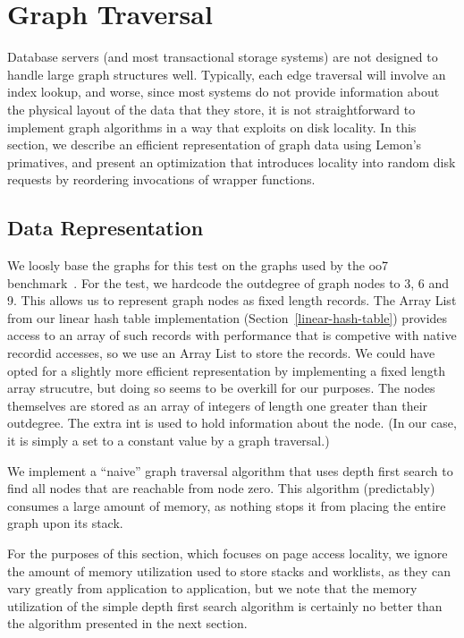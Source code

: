 \documentclass[letterpaper,twocolumn,english]{article}
\newcommand{\yad}{Lemon\xspace}
\begin{document}
\section{Graph Traversal\label{TransClos}}

Database servers (and most transactional storage systems) are not
designed to handle large graph structures well.  Typically, each edge
traversal will involve an index lookup, and worse, since most systems
do not provide information about the physical layout of the data that
they store, it is not straightforward to implement graph algorithms in
a way that exploits on disk locality.  In this section, we describe an
efficient representation of graph data using \yad's primatives, and
present an optimization that introduces locality into random disk
requests by reordering invocations of wrapper functions.

\subsection {Data Representation}

We loosly base the graphs for this test on the graphs used by the oo7
benchmark~\cite{oo7}.  For the test, we hardcode the outdegree of
graph nodes to 3, 6 and 9.  This allows us to represent graph nodes as
fixed length records.  The Array List from our linear hash table
implementation (Section~\ref{linear-hash-table}) provides access to an
array of such records with performance that is competive with native
recordid accesses, so we use an Array List to store the records.  We
could have opted for a slightly more efficient representation by
implementing a fixed length array strucutre, but doing so seems to be
overkill for our purposes.  The nodes themselves are stored as an
array of integers of length one greater than their outdegree. The
extra int is used to hold information about the node.  (In our case,
it is simply a set to a constant value by a graph traversal.)

We implement a ``naive'' graph traversal algorithm that uses depth
first search to find all nodes that are reachable from node zero.
This algorithm (predictably) consumes a large amount of memory, as
nothing stops it from placing the entire graph upon its stack.  

For the purposes of this section, which focuses on page access
locality, we ignore the amount of memory utilization used to store
stacks and worklists, as they can vary greatly from application to
application, but we note that the memory utilization of the simple
depth first search algorithm is certainly no better than the algorithm
presented in the next section.
\end{document}
